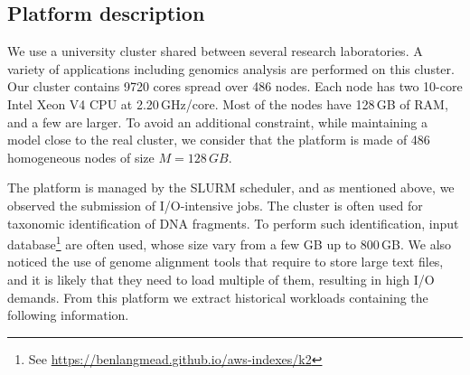 \documentclass[conference]{IEEEtran}
\newcommand{\memory}{\ensuremath{\mathit{M}}\xspace}
\begin{document}
\subsection{Platform description}
We use a university cluster shared between several research laboratories. A variety of applications including genomics analysis are performed on this cluster.
Our cluster contains 9720 cores spread over 486 nodes. Each node has two
10-core Intel Xeon V4 CPU at 2.20\,GHz/core.
Most of the nodes have 128\,GB of RAM, and a few are larger.
To avoid an additional constraint, while maintaining a model close to the real cluster,
we consider that the platform is made of 486 homogeneous nodes of size
$\memory = 128\,GB$.

The platform is managed by the SLURM scheduler, and as mentioned above, we observed the submission of I/O-intensive jobs.
The cluster is often used for taxonomic identification of DNA fragments. 
To perform such identification, 
input database\footnote{See \url{https://benlangmead.github.io/aws-indexes/k2}}
are often used,
whose size vary from a few GB up to 800\,GB.
We also noticed the use of genome alignment tools that require to store large text files,
and it is likely that they need to load multiple of them, resulting in high I/O demands.
From this platform we extract historical workloads containing the following information.
\end{document}
